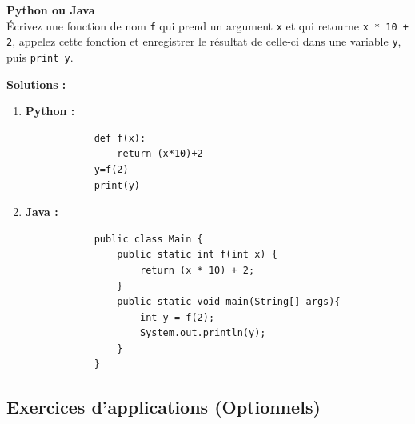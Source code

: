 \begin{Exercice}[5 minutes] \textbf{Python ou Java} \\
    Écrivez une fonction de nom \lstinline{f} qui prend un argument \lstinline{x} et qui retourne \lstinline{x * 10 + 2}, appelez cette fonction et enregistrer le résultat de celle-ci dans une variable \lstinline{y}, puis \lstinline{print y}.
    \begin{conseil}
        
    \end{conseil}
    \textbf{Solutions :}
    \begin{enumerate}
        \item \textbf{Python :}
        \begin{verbatim}
            def f(x):
                return (x*10)+2
            y=f(2)
            print(y)
        \end{verbatim}
        
        \item \textbf{Java :}
        \begin{verbatim}
            public class Main {
                public static int f(int x) {
                    return (x * 10) + 2;
                }
                public static void main(String[] args){
                    int y = f(2);
                    System.out.println(y);
                }
            }
        \end{verbatim}
    \end{enumerate}

\end{Exercice}

\subsection{Exercices d'applications (Optionnels)}

